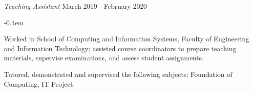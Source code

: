 \documentclass{cv}
\begin{document}
\begin{list}{}{\setlength{\leftmargin}{0em}}
    \vspace{0.1em} \newline 
    {\textit{Teaching Assistant}} \hfill {March 2019 - February 2020}%
    \begin{list}{\raisebox{0.2em}{\tiny$\bullet$} \hspace{0em}}{\setlength{\leftmargin}{2.0em}}
        \itemsep -0.4em \vspace{-0.4em}
        \item Worked in School of Computing and Information Systems, Faculty of Engineering and Information Technology; assisted course coordinators to prepare teaching materials, supervise examinations, and assess student assignments.
        \item Tutored, demonstrated and supervised the following subjects: Foundation of Computing, IT Project.
    \end{list}
\end{list}

\end{document}
